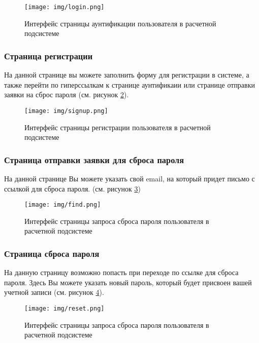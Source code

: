 \documentclass[a4paper,12pt,reqno]{article}
\begin{document}
    \begin{figure}[H]
        \centering
        \texttt{[image: img/login.png]}
        \caption{Интерфейс страницы аунтификации пользователя в расчетной подсистеме}
        \label{pic:login}
    \end{figure}

    \subsubsection{Страница регистрации}
    На данной странице вы можете заполнить форму для регистрации в системе, а также перейти по гиперссылкам к странице аунтификаии или странице отправки заявки на сброс пароля (см. рисунок \ref{pic:signup}).

    \begin{figure}[H]
        \centering
        \texttt{[image: img/signup.png]}
        \caption{Интерфейс страницы регистрации пользователя в расчетной подсистеме}
        \label{pic:signup}
    \end{figure}

    \subsubsection{Страница отправки заявки для сброса пароля}
    На данной странице Вы можете указать свой email, на который придет письмо с ссылкой для сброса пароля. (см. рисунок \ref{pic:find})

    \begin{figure}[H]
        \centering
        \texttt{[image: img/find.png]}
        \caption{Интерфейс страницы запроса сброса пароля пользователя в расчетной подсистеме}
        \label{pic:find}
    \end{figure}

    \subsubsection{Страница сброса пароля}
    На данную страницу возможно попасть при переходе по ссылке для сброса пароля. Здесь Вы можете указать новый пароль, который будет присвоен вашей учетной записи (см. рисунок \ref{pic:reset}).

    \begin{figure}[H]
        \centering
        \texttt{[image: img/reset.png]}
        \caption{Интерфейс страницы запроса сброса пароля пользователя в расчетной подсистеме}
        \label{pic:reset}
    \end{figure}
\end{document}
